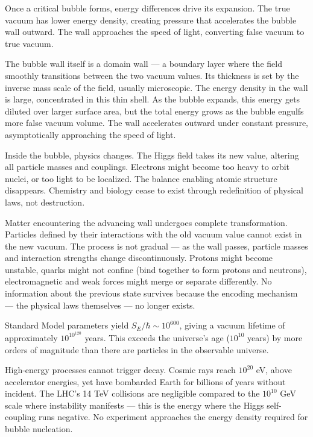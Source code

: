 Once a critical bubble forms, energy differences drive its expansion. The true vacuum has lower energy density, creating pressure that accelerates the bubble wall outward. The wall approaches the speed of light, converting false vacuum to true vacuum.

The bubble wall itself is a domain wall — a boundary layer where the field smoothly transitions between the two vacuum values. Its thickness is set by the inverse mass scale of the field, usually microscopic. The energy density in the wall is large, concentrated in this thin shell. As the bubble expands, this energy gets diluted over larger surface area, but the total energy grows as the bubble engulfs more false vacuum volume. The wall accelerates outward under constant pressure, asymptotically approaching the speed of light.

Inside the bubble, physics changes. The Higgs field takes its new value, altering all particle masses and couplings. Electrons might become too heavy to orbit nuclei, or too light to be localized. The balance enabling atomic structure disappears. Chemistry and biology cease to exist through redefinition of physical laws, not destruction.

Matter encountering the advancing wall undergoes complete transformation. Particles defined by their interactions with the old vacuum value cannot exist in the new vacuum. The process is not gradual — as the wall passes, particle masses and interaction strengths change discontinuously. Protons might become unstable, quarks might not confine (bind together to form protons and neutrons), electromagnetic and weak forces might merge or separate differently. No information about the previous state survives because the encoding mechanism — the physical laws themselves — no longer exists.

Standard Model parameters yield $S_E/\hbar \sim 10^{600}$, giving a vacuum lifetime of approximately $10^{10^{120}}$ years. This exceeds the universe's age ($10^{10}$ years) by more orders of magnitude than there are particles in the observable universe.

High-energy processes cannot trigger decay. Cosmic rays reach $10^{20}$ eV, above accelerator energies, yet have bombarded Earth for billions of years without incident. The LHC's 14 TeV collisions are negligible compared to the $10^{10}$ GeV scale where instability manifests — this is the energy where the Higgs self-coupling runs negative. No experiment approaches the energy density required for bubble nucleation.

